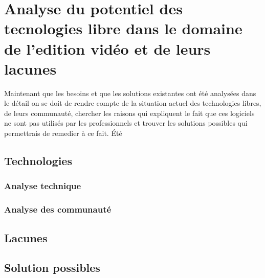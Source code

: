 \newpage
\section{Analyse du potentiel des tecnologies libre dans le domaine de l'edition
vid\'{e}o et de leurs lacunes}

Maintenant que les besoins et que les solutions existantes ont
\'{e}t\'{e} analys\'{e}es dans le d\'{e}tail on se doit de rendre compte de la situation
actuel des technologies libres, de leurs communaut\'{e}, chercher les raisons qui
expliquent le fait que ces logiciels ne sont pas utilis\'{e}s par les
professionnels et trouver les solutions possibles qui permettrais de remedier \`{a}
ce fait. Été

  \subsection{Technologies}
    \subsubsection{Analyse technique}
    \subsubsection{Analyse des communaut\'{e}}
  \subsection{Lacunes}
  \subsection{Solution possibles}
